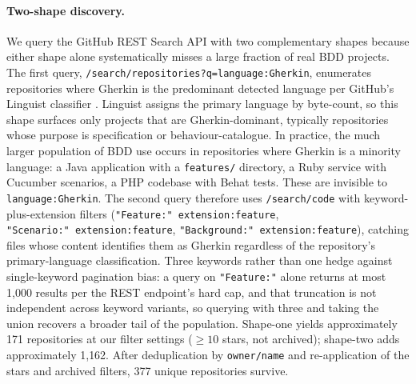 \documentclass[11pt,a4paper]{article}
\begin{document}
\paragraph{Two-shape discovery.} We query the GitHub REST Search API
\citep{github2024restsearch} with two complementary shapes because
either shape alone systematically misses a large fraction of real
BDD projects. The first query,
\texttt{/search/\allowbreak repositories?\allowbreak q=language:\allowbreak Gherkin}, enumerates
repositories where Gherkin is the predominant detected language per
GitHub's Linguist classifier \citep{linguist2024}. Linguist assigns
the primary language by byte-count, so this shape surfaces only
projects that are Gherkin-dominant, typically repositories whose
purpose is specification or behaviour-catalogue. In practice, the
much larger population of BDD use occurs in repositories where
Gherkin is a minority language: a Java application with a
\texttt{features/} directory, a Ruby service with Cucumber scenarios,
a PHP codebase with Behat tests. These are invisible to
\texttt{language:Gherkin}. The second query therefore uses
\texttt{/search/code} with keyword-plus-extension filters
(\texttt{"Feature:"\allowbreak\ extension:\allowbreak feature},
\texttt{"Scenario:"\allowbreak\ extension:\allowbreak feature},
\texttt{"Background:"\allowbreak\ extension:\allowbreak feature}), catching files whose
content identifies them as Gherkin regardless of the repository's
primary-language classification. Three keywords rather than one
hedge against single-keyword pagination bias: a query on
\texttt{"Feature:"} alone returns at most 1{,}000 results per the
REST endpoint's hard cap, and that truncation is not independent
across keyword variants, so querying with three and taking the
union recovers a broader tail of the population. Shape-one yields
approximately 171 repositories at our filter settings
(\(\geq 10\) stars, not archived); shape-two adds approximately
1{,}162. After deduplication by \texttt{owner/name} and
re-application of the stars and archived filters, 377 unique
repositories survive.
\end{document}
